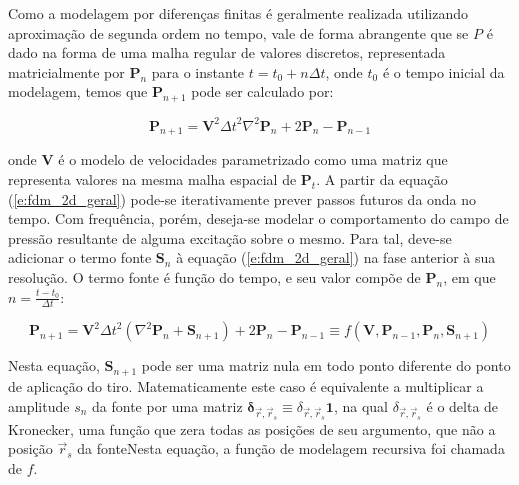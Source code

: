     \DIFaddbegin \noindent {}

    \DIFaddend Como a modelagem por diferenças finitas é geralmente realizada utilizando aproximação de segunda ordem no tempo, vale de forma abrangente que se $P$ é dado na forma de uma malha regular de valores discretos, representada matricialmente por $\boldsymbol{P}_{n}$ para o instante $t=t_0+n\Delta t$, onde $t_0$ é o tempo inicial da modelagem, temos que $\boldsymbol{P}_{n+1}$ pode ser calculado por:

    \begin{equation} \label{e:fdm_2d_geral}
      \boldsymbol{P}_{n+1} =
        \boldsymbol{V}^2 {\Delta t}^2
        \nabla^2 \boldsymbol{P}_{n} +
        2 \boldsymbol{P}_{n} -
        \boldsymbol{P}_{n-1}
    \end{equation}

    \noindent onde $\boldsymbol{V}$ é o modelo de velocidades parametrizado como uma matriz que representa valores na mesma malha espacial de $\boldsymbol{P}_t$. A partir da equação (\ref{e:fdm_2d_geral}) pode-se iterativamente prever passos futuros da onda no tempo. Com frequência, porém, deseja-se modelar o comportamento do campo de pressão resultante de alguma excitação sobre o mesmo. Para tal, deve-se adicionar o termo fonte $\boldsymbol{S}_n$ à equação (\ref{e:fdm_2d_geral}) na fase anterior à sua resolução. O termo fonte é função do tempo, e seu valor compõe de $\boldsymbol{P}_{n}$, em que $n=\frac{t-t_0}{\Delta t}$:

    \begin{equation} \label{e:fdm_2d_geral_com_fonte}
      \boldsymbol{P}_{n+1} =
        \boldsymbol{V}^2 {\Delta t}^2
        (\nabla^2 \boldsymbol{P}_{n} + \boldsymbol{S}_{n+1}) +
        2 \boldsymbol{P}_{n} -
        \boldsymbol{P}_{n-1}
        \equiv f(\boldsymbol{V}, \boldsymbol{P}_{n-1}, \boldsymbol{P}_n, \boldsymbol{S}_{n+1})
    \end{equation}

    Nesta equação, $\boldsymbol{S}_{n+1}$ pode ser uma matriz nula em todo ponto diferente do ponto de aplicação do tiro. Matematicamente este caso é equivalente a multiplicar a amplitude $s_n$ da fonte por uma matriz $\boldsymbol{\delta}_{\vec{r}, \vec{r}_s} \equiv \delta_{\vec{r}, \vec{r}_s} \boldsymbol{1}$, na qual $\delta_{\vec{r}, \vec{r}_s}$ é o delta de Kronecker, uma função que zera todas as posições de seu argumento, que não a posição $\vec{r}_s$ da fonte\DIFdelbegin {}\DIFdelend \DIFaddbegin {}\DIFaddend Nesta equação, a função de modelagem recursiva foi chamada de $f$.

